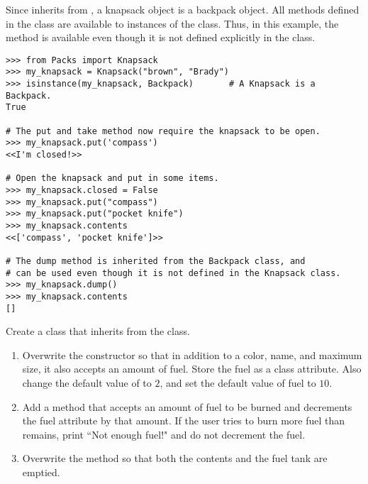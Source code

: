 Since  inherits from , a knapsack object is a backpack object.
All methods defined in the  class are available to instances of the  class.
Thus, in this example, the  method is available even though it is not defined explicitly in the  class.

\begin{lstlisting}
>>> from Packs import Knapsack
>>> my_knapsack = Knapsack("brown", "Brady")
>>> isinstance(my_knapsack, Backpack)       # A Knapsack is a Backpack.
True

# The put and take method now require the knapsack to be open.
>>> my_knapsack.put('compass')
<<I'm closed!>>

# Open the knapsack and put in some items.
>>> my_knapsack.closed = False
>>> my_knapsack.put("compass")
>>> my_knapsack.put("pocket knife")
>>> my_knapsack.contents
<<['compass', 'pocket knife']>>

# The dump method is inherited from the Backpack class, and
# can be used even though it is not defined in the Knapsack class.
>>> my_knapsack.dump()
>>> my_knapsack.contents
[]
\end{lstlisting}

\begin{problem}
Create a  class that inherits from the  class.
\begin{enumerate}
\item Overwrite the constructor so that in addition to a color, name, and maximum size, it also accepts an amount of fuel.
Store the fuel as a class attribute.
Also change the default value of  to $2$, and set the default value of fuel to $10$.

\item Add a  method that accepts an amount of fuel to be burned and decrements the fuel attribute by that amount.
If the user tries to burn more fuel than remains, print ``Not enough fuel!" and do not decrement the fuel.

\item Overwrite the  method so that both the contents and the fuel tank are emptied.
\end{enumerate}
\end{problem}


